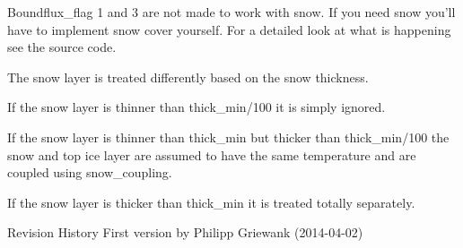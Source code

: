 Boundflux\_\-flag 1 and 3 are not made to work with snow. If you need snow you'll have to implement snow cover yourself. For a detailed look at what is happening see the source code.

The snow layer is treated differently based on the snow thickness.
\begin{DoxyItemize}
\item If the snow layer is thinner than thick\_\-min/100 it is simply ignored.
\item If the snow layer is thinner than thick\_\-min but thicker than thick\_\-min/100 the snow and top ice layer are assumed to have the same temperature and are coupled using snow\_\-coupling.
\item If the snow layer is thicker than thick\_\-min it is treated totally separately.
\end{DoxyItemize}

\begin{DoxyParagraph}{Revision History}
First version by Philipp Griewank (2014-\/04-\/02) 
\end{DoxyParagraph}
